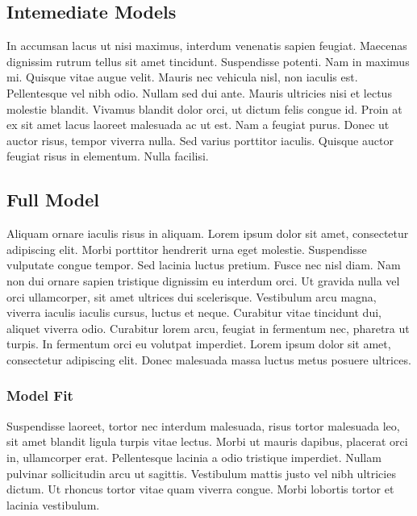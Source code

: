 

\subsection{Intemediate Models}

In accumsan lacus ut nisi maximus, interdum venenatis sapien feugiat. Maecenas dignissim rutrum tellus sit amet tincidunt. Suspendisse potenti. Nam in maximus mi. Quisque vitae augue velit. Mauris nec vehicula nisl, non iaculis est. Pellentesque vel nibh odio. Nullam sed dui ante. Mauris ultricies nisi et lectus molestie blandit. Vivamus blandit dolor orci, ut dictum felis congue id. Proin at ex sit amet lacus laoreet malesuada ac ut est. Nam a feugiat purus. Donec ut auctor risus, tempor viverra nulla. Sed varius porttitor iaculis. Quisque auctor feugiat risus in elementum. Nulla facilisi.

\subsection{Full Model}

Aliquam ornare iaculis risus in aliquam. Lorem ipsum dolor sit amet, consectetur adipiscing elit. Morbi porttitor hendrerit urna eget molestie. Suspendisse vulputate congue tempor. Sed lacinia luctus pretium. Fusce nec nisl diam. Nam non dui ornare sapien tristique dignissim eu interdum orci. Ut gravida nulla vel orci ullamcorper, sit amet ultrices dui scelerisque. Vestibulum arcu magna, viverra iaculis iaculis cursus, luctus et neque. Curabitur vitae tincidunt dui, aliquet viverra odio. Curabitur lorem arcu, feugiat in fermentum nec, pharetra ut turpis. In fermentum orci eu volutpat imperdiet. Lorem ipsum dolor sit amet, consectetur adipiscing elit. Donec malesuada massa luctus metus posuere ultrices.



\subsubsection{Model Fit}

Suspendisse laoreet, tortor nec interdum malesuada, risus tortor malesuada leo, sit amet blandit ligula turpis vitae lectus. Morbi ut mauris dapibus, placerat orci in, ullamcorper erat. Pellentesque lacinia a odio tristique imperdiet. Nullam pulvinar sollicitudin arcu ut sagittis. Vestibulum mattis justo vel nibh ultricies dictum. Ut rhoncus tortor vitae quam viverra congue. Morbi lobortis tortor et lacinia vestibulum.

